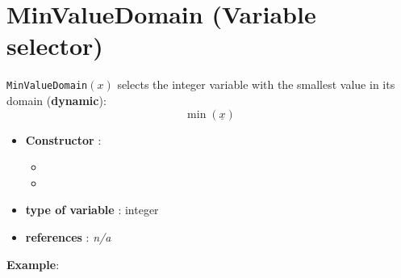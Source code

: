 \section{MinValueDomain (Variable selector)}\label{minvaldomain:minvaldomainvarselector}\hypertarget{minvaldomain:minvaldomainvarselector}{}
\begin{notedef}
  \texttt{MinValueDomain}$(x)$ selects the integer variable with the smallest value in its domain (\textbf{dynamic}):
$$\min(\underline{x})$$
\end{notedef}

\begin{itemize}
	\item \textbf{Constructor} : 
	\begin{itemize}
	\item {}
	\item {}
	\end{itemize}	
	\item \textbf{type of variable} : integer
	\item \textbf{references} : \emph{n/a}
\end{itemize}

\textbf{Example}:
%

